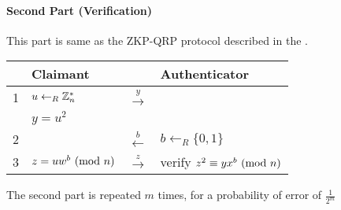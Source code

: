 \paragraph{Second Part (Verification)}
This part is same as the ZKP-QRP protocol described in the \cite{GMR}.
\bigskip
\begin{center}
	\begin{tabular}{rl|c|l}
		& Claimant & & Authenticator \\
		\hline
		1 & $u \leftarrow_R \Bbb{Z}_{n}^{*}$ & $\xrightarrow{y}$ \\
		& $y = u^2$ & \\
		2 & & $\xleftarrow{b}$ & $b \leftarrow_R \{0, 1\} $ \\
		3 & $z = uw^b \ (\mathrm{mod}\ n) $ & $\xrightarrow{z}$ & verify $z^2 \equiv yx^b \ (\mathrm{mod}\ n)$\\ 
	\end{tabular}
\end{center}
\bigskip
The second part is repeated $m$ times, for a probability of error of $\frac{1}{2^m}$




